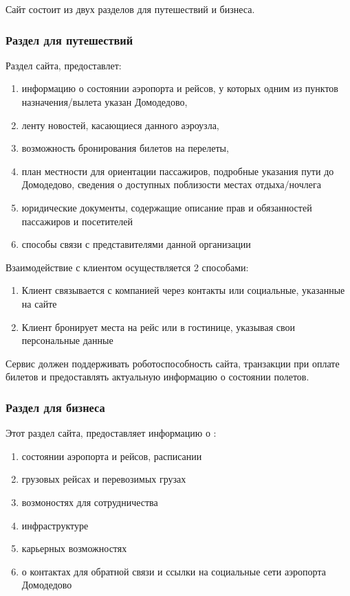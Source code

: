 
Сайт состоит из двух разделов для путешествий и бизнеса.

\subsubsection{Раздел для путешествий}

Раздел сайта, предоставлет:
\begin{enumerate}
      \item информацию о состоянии аэропорта и рейсов,
            у которых одним из пунктов назначения/вылета
            указан Домодедово,
      \item ленту новостей, касающиеся данного аэроузла,
      \item возможность бронирования билетов на перелеты,
      \item план местности для ориентации пассажиров,
            подробные указания пути до Домодедово, сведения
            о доступных поблизости местах отдыха/ночлега
      \item юридические документы, содержащие описание
            прав и обязанностей пассажиров и посетителей
      \item способы связи с представителями данной
            организации
\end{enumerate}

Взаимодействие с клиентом осуществляется 2 способами:
\begin{enumerate}
      \item Клиент связывается с компанией через контакты
            или социальные, указанные на сайте
      \item Клиент бронирует места на рейс или в гостинице,
            указывая свои персональные данные
\end{enumerate}

Сервис должен поддерживать роботоспособность сайта,
транзакции при оплате билетов и предоставлять актуальную
информацию о состоянии полетов.

\subsubsection{Раздел для бизнеса}

Этот раздел сайта, предоставляет информацию о :
\begin{enumerate}
      \item состоянии аэропорта и рейсов, расписании
      \item грузовых рейсах и перевозимых грузах
      \item возмоностях для сотрудничества
      \item инфраструктуре
      \item карьерных возможностях
      \item о контактах для обратной связи и ссылки
            на социальные сети аэропорта Домодедово
\end{enumerate}
